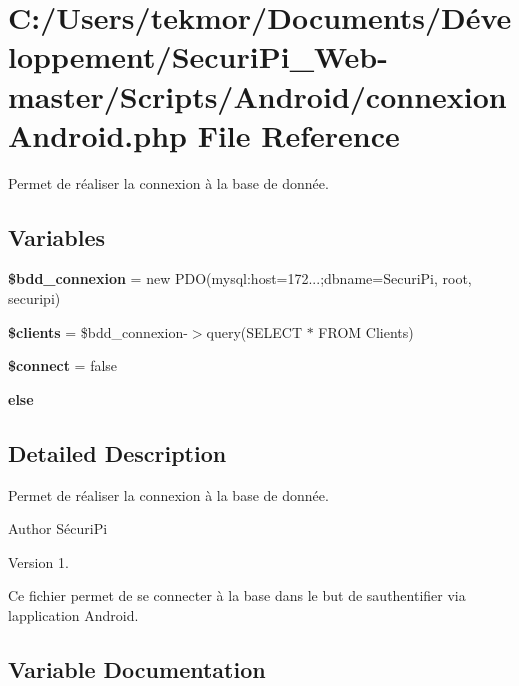\section{C\+:/\+Users/tekmor/\+Documents/\+Développement/\+Securi\+Pi\+\_\+\+Web-\/master/\+Scripts/\+Android/connexion\+Android.php File Reference}
\label{connexion_android_8php}


Permet de r\'{e}aliser la connexion \`{a} la base de donn\'{e}e.  


\subsection*{Variables}
\begin{DoxyCompactItemize}
\item 
{\bf \$bdd\+\_\+connexion} = new P\+D\+O(\textquotesingle{}mysql\+:host=172...;dbname=Securi\+Pi\textquotesingle{}, \textquotesingle{}root\textquotesingle{}, \textquotesingle{}securipi\textquotesingle{})
\item 
{\bf \$clients} = \$bdd\+\_\+connexion-\/$>$query(\textquotesingle{}S\+E\+L\+E\+C\+T $\ast$ F\+R\+O\+M Clients\textquotesingle{})
\item 
{\bf \$connect} = false
\item 
{\bf else}
\end{DoxyCompactItemize}


\subsection{Detailed Description}
Permet de r\'{e}aliser la connexion \`{a} la base de donn\'{e}e. 

\begin{DoxyAuthor}{Author}
S\'{e}curi\+Pi 
\end{DoxyAuthor}
\begin{DoxyVersion}{Version}
1.
\end{DoxyVersion}
Ce fichier permet de se connecter \`{a} la base dans le but de s\textquotesingle{}authentifier via l\textquotesingle{}application Android. 

\subsection{Variable Documentation}
